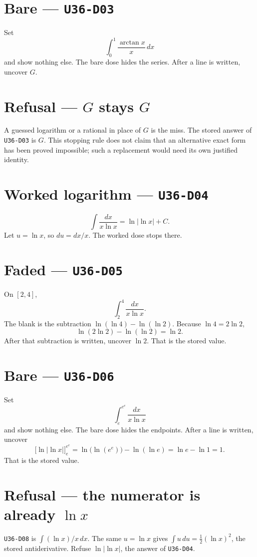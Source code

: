 \section{Bare --- \texttt{U36-D03}}
Set
\[
\int_0^1\frac{\arctan x}{x}\,dx
\]
and show nothing else. The bare dose hides the series. After a line is written, uncover $G$.

\section{Refusal --- $G$ stays $G$}
A guessed logarithm or a rational in place of $G$ is the miss. The stored answer of \texttt{U36-D03} is $G$. This stopping rule does not claim that an alternative exact form has been proved impossible; such a replacement would need its own justified identity.

\section{Worked logarithm --- \texttt{U36-D04}}
\[
\int\frac{dx}{x\ln x}=\ln|\ln x|+C.
\]
Let $u=\ln x$, so $du=dx/x$. The worked dose stops there.

\section{Faded --- \texttt{U36-D05}}
On $[2,4]$,
\[
\int_2^4\frac{dx}{x\ln x}.
\]
The blank is the subtraction $\ln(\ln 4)-\ln(\ln 2)$. Because $\ln 4=2\ln 2$,
\[
\ln(2\ln 2)-\ln(\ln 2)=\ln 2.
\]
After that subtraction is written, uncover $\ln 2$. That is the stored value.

\section{Bare --- \texttt{U36-D06}}
Set
\[
\int_e^{e^e}\frac{dx}{x\ln x}
\]
and show nothing else. The bare dose hides the endpoints. After a line is written, uncover
\[
\bigl[\ln|\ln x|\bigr]_e^{e^e}=\ln\bigl(\ln(e^e)\bigr)-\ln(\ln e)=\ln e-\ln 1=1.
\]
That is the stored value.

\section{Refusal --- the numerator is already $\ln x$}
\texttt{U36-D08} is $\int(\ln x)/x\,dx$. The same $u=\ln x$ gives $\int u\,du=\frac12(\ln x)^2$, the stored antiderivative. Refuse $\ln|\ln x|$, the answer of \texttt{U36-D04}.

